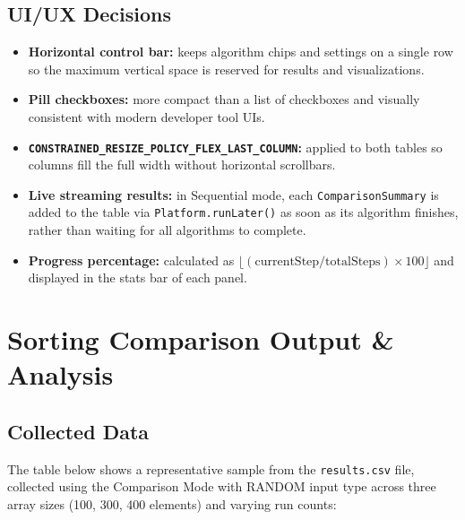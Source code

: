 \documentclass[12pt,a4paper]{article}
\begin{document}
\subsection{UI/UX Decisions}

\begin{itemize}
    \item \textbf{Horizontal control bar:} keeps algorithm chips and settings
          on a single row so the maximum vertical space is reserved for results
          and visualizations.
    \item \textbf{Pill checkboxes:} more compact than a list of checkboxes and
          visually consistent with modern developer tool UIs.
    \item \textbf{\texttt{CONSTRAINED\_RESIZE\_POLICY\_FLEX\_LAST\_COLUMN}:}
          applied to both tables so columns fill the full width without
          horizontal scrollbars.
    \item \textbf{Live streaming results:} in Sequential mode, each
          \texttt{ComparisonSummary} is added to the table via
          \texttt{Platform.runLater()} as soon as its algorithm finishes,
          rather than waiting for all algorithms to complete.
    \item \textbf{Progress percentage:} calculated as
          $\lfloor(\text{currentStep}/\text{totalSteps}) \times 100\rfloor$
          and displayed in the stats bar of each panel.
\end{itemize}

\section{Sorting Comparison Output \& Analysis}

\subsection{Collected Data}

The table below shows a representative sample from the \texttt{results.csv} file,
collected using the Comparison Mode with RANDOM input type across three array sizes
(100, 300, 400 elements) and varying run counts:
\end{document}
